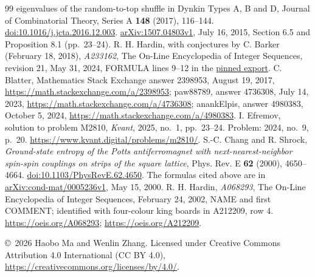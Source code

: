 \documentclass[11pt]{article}
\begin{document}
\begin{thebibliography}{99}
{eigenvalues of the random-to-top shuffle in Dynkin Types A, B and D},
Journal of Combinatorial Theory, Series A \textbf{148} (2017), 116--144.
\href{https://doi.org/10.1016/j.jcta.2016.12.003}{doi:10.1016/j.jcta.2016.12.003}.
\href{https://arxiv.org/abs/1507.04803v1}{arXiv:1507.04803v1},
July 16, 2015, Section 6.5 and Proposition 8.1 (pp.\ 23--24).
R. H. Hardin, with conjectures by C. Barker (February 18, 2018),
\emph{A233162}, The On-Line Encyclopedia of Integer Sequences,
revision 21, May 31, 2024, FORMULA lines 9--12 in the
\href{https://raw.githubusercontent.com/oeis/oeisdata/571197984aeda7b8b680fe3a1f6a43f9898cd441/seq/A233/A233162.seq}{pinned export}.
C. Blatter, Mathematics Stack Exchange answer 2398953, August 19, 2017,
\url{https://math.stackexchange.com/a/2398953};
paw88789, answer 4736308, July 14, 2023,
\url{https://math.stackexchange.com/a/4736308};
anankElpis, answer 4980383, October 5, 2024,
\url{https://math.stackexchange.com/a/4980383}.
I. Efremov, solution to problem M2810, \emph{Kvant}, 2025, no.\ 1,
pp.\ 23--24. Problem: 2024, no.\ 9, p.\ 20.
\url{https://www.kvant.digital/problems/m2810/}.
S.-C. Chang and R. Shrock,
\emph{Ground-state entropy of the Potts antiferromagnet with
next-nearest-neighbor spin-spin couplings on strips of the square lattice},
Phys. Rev. E \textbf{62} (2000), 4650--4664.
\href{https://doi.org/10.1103/PhysRevE.62.4650}{doi:10.1103/PhysRevE.62.4650}.
The formulas cited above are in
\href{https://arxiv.org/abs/cond-mat/0005236v1}{arXiv:cond-mat/0005236v1},
May 15, 2000.
R. H. Hardin, \emph{A068293}, The On-Line Encyclopedia of Integer Sequences,
February 24, 2002, NAME and first COMMENT;
identified with four-colour king boards in A212209, row 4.
\url{https://oeis.org/A068293}; \url{https://oeis.org/A212209}.
\end{thebibliography}
\noindent\small
\copyright\ 2026 Haobo Ma and Wenlin Zhang.
Licensed under Creative Commons Attribution 4.0 International
(CC BY 4.0), \url{https://creativecommons.org/licenses/by/4.0/}.
\end{document}
